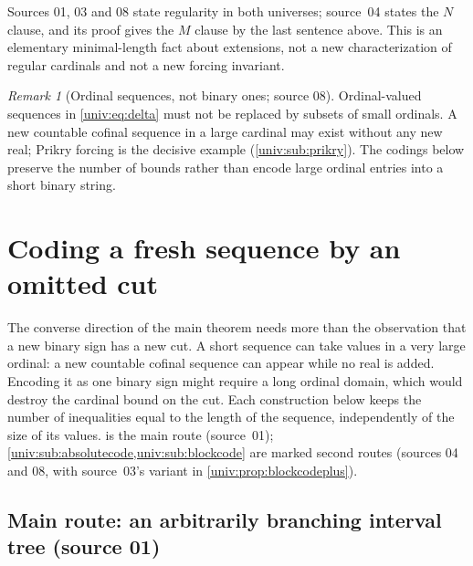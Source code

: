 \documentclass[11pt,letterpaper]{article}
\numberwithin{equation}{section}
\theoremstyle{definition}
\theoremstyle{remark}
\newtheorem{remark}[remark]{Remark}
\begin{document}
Sources 01, 03 and 08 state regularity in both universes; source~04 states the
$N$ clause, and its proof gives the $M$ clause by the last sentence above.
This is an elementary minimal-length fact about extensions, not a new
characterization of regular cardinals and not a new forcing invariant.

\begin{remark}[Ordinal sequences, not binary ones; source 08]\label{univ:rem:ordinalnotbinary}
Ordinal-valued sequences in \eqref{univ:eq:delta} must not be replaced by
subsets of small ordinals. A new countable cofinal sequence in a large
cardinal may exist without any new real; Prikry forcing is the decisive
example (\cref{univ:sub:prikry}). The codings below preserve the number of
bounds rather than encode large ordinal entries into a short binary string.
\end{remark}

\section{Coding a fresh sequence by an omitted cut}\label{univ:sec:decoder}

The converse direction of the main theorem needs more than the observation
that a new binary sign has a new cut. A short sequence can take values in a
very large ordinal: a new countable cofinal sequence can appear while no real
is added. Encoding it as one binary sign might require a long ordinal domain,
which would destroy the cardinal bound on the cut. Each construction below
keeps the number of inequalities equal to the length of the sequence,
independently of the size of its values.  is the main
route (source~01); \cref{univ:sub:absolutecode,univ:sub:blockcode} are marked
second routes (sources 04 and 08, with source~03's variant in
\cref{univ:prop:blockcodeplus}).

\subsection{Main route: an arbitrarily branching interval tree (source 01)}\label{univ:sub:tree}
\end{document}
